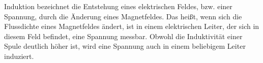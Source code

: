 Induktion bezeichnet die Entstehung eines elektrischen Feldes, bzw. einer Spannung, durch die Änderung eines Magnetfeldes. Das heißt, wenn sich die Flussdichte eines Magnetfeldes ändert, ist in einem elektrischen Leiter, der sich in diesem Feld befindet, eine Spannung messbar. Obwohl die Induktivität einer Spule deutlich höher ist, wird eine Spannung auch in einem beliebigem Leiter induziert.